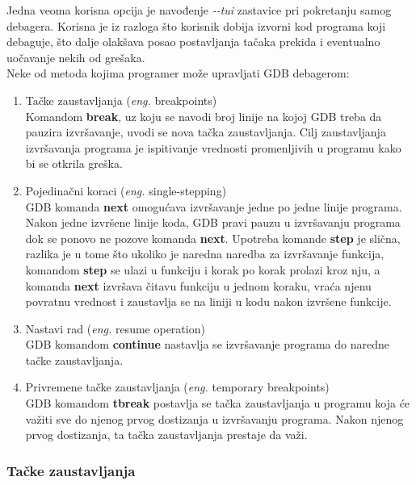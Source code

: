 \documentclass[a4paper]{article}
\begin{document}
Jedna veoma korisna opcija je navođenje \textit{-\phantom{}-tui} zastavice pri pokretanju samog debagera. 
Korisna je iz razloga što korisnik dobija izvorni kod programa koji debaguje, što dalje olakšava posao postavljanja
tačaka prekida i eventualno uočavanje nekih od grešaka\cite{oReilly}.\\
Neke od metoda kojima programer može upravljati GDB debagerom\cite{art_debugging}:
\begin{enumerate}
\item Tačke zaustavljanja (\textit{eng.} breakpoints) \\
Komandom \textbf{break}, uz koju se navodi broj linije na kojoj GDB treba da pauzira izvršavanje, 
uvodi se nova tačka zaustavljanja. Cilj zaustavljanja izvršavanja programa je ispitivanje vrednosti
promenljivih u programu kako bi se otkrila greška.
\item Pojedinačni koraci (\textit{eng.} single-stepping)\\
GDB komanda \textbf{next} omogućava izvršavanje jedne po jedne linije programa. 
Nakon jedne izvršene linije koda, GDB pravi pauzu u izvršavanju programa dok se ponovo ne 
pozove komanda \textbf{next}. Upotreba komande \textbf{step} je slična, razlika je u tome što
ukoliko je naredna naredba za izvršavanje funkcija, 
komandom \textbf{step} se ulazi u funkciju i korak po korak prolazi kroz nju, a 
komanda \textbf{next} izvršava čitavu funkciju u jednom koraku, vraća njenu povratnu 
vrednost i zaustavlja se na liniji u kodu nakon izvršene funkcije.
\item Nastavi rad (\textit{eng.} resume operation)\\
GDB komandom \textbf{continue} nastavlja se izvršavanje programa do naredne tačke zaustavljanja. 
\item Privremene tačke zaustavljanja (\textit{eng.} temporary breakpoints)\\
GDB komandom \textbf{tbreak} postavlja se tačka zaustavljanja u programu koja će važiti 
sve do njenog prvog dostizanja u izvršavanju programa. Nakon njenog prvog dostizanja, 
ta tačka zaustavljanja prestaje da važi. 
\end{enumerate}

\subsubsection{Tačke zaustavljanja}
\label{subsec:gdbtackezaustavljanja}
\end{document}
